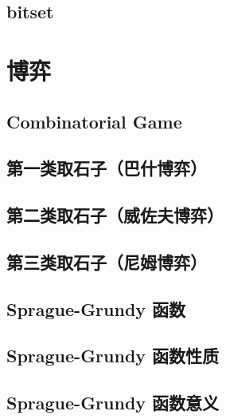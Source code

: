 \documentclass[a4paper]{article}
\begin{document}
\begin{CJK*}{UTF8}{gbsn}
\begin{multicols}{3}
\begin{flushleft}
\subsection{bitset}


\section{博弈}

\subsection{Combinatorial Game}


\subsection{第一类取石子（巴什博弈）}


\subsection{第二类取石子（威佐夫博弈）}


\subsection{第三类取石子（尼姆博弈）}


\subsection{Sprague-Grundy 函数}


\subsection{Sprague-Grundy 函数性质}


\subsection{Sprague-Grundy 函数意义}



\end{flushleft}
\end{multicols}
\end{CJK*}
\end{document}
